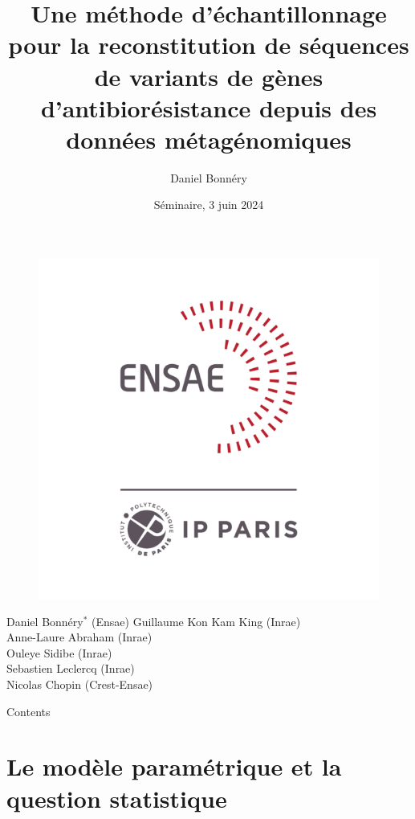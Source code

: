 \documentclass{beamer}
\author[Daniel Bonnéry]{Daniel Bonnéry}
\institute[]{}
\title[Reconstitution de séquences de variants ]{Une méthode d’échantillonnage pour la reconstitution de séquences de variants de gènes d'antibiorésistance depuis des données métagénomiques}
\date[2024/09/30]{Séminaire, \small 3 juin 2024}
\newcommand{\fr}[1]{#1}
\newcommand{\en}[1]{}
\begin{document}
{


\begin{frame}\label{start}
    \titlepage
        
    \begin{figure}
            \includegraphics[scale=0.15]{images/ensae.png} 
    \end{figure}
\end{frame}
}
\begin{frame}
        Daniel Bonnéry$^*$ (Ensae)
        Guillaume Kon Kam King (Inrae)\\
        Anne-Laure Abraham (Inrae)\\
	Ouleye Sidibe (Inrae)\\
	Sebastien Leclercq (Inrae)\\
        Nicolas Chopin (Crest-Ensae)
\end{frame}
\begin{frame}{Contents}
    \tableofcontents[sectionstyle=show, subsectionstyle=show/shaded/hide, subsubsectionstyle=show/shaded/hide]
\end{frame}

\section{\fr{Le modèle paramétrique et la question statistique}\en{The parametric model and the statistical question}}
\end{document}
